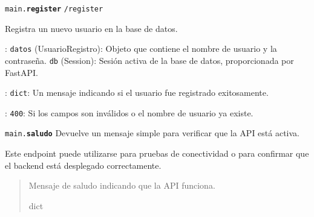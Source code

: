 \documentclass[a4paper,11pt,spanish]{sphinxmanual}
\newcommand{\robotoMonoBold}{\fontseries{b}\selectfont\ttfamily}
\renewcommand{\sphinxcode}[1]{\textcolor{sphinxorangeCode}{{\robotoMonoBold #1}}}
\renewcommand{\sphinxbfcode}[1]{\textbf{\sphinxcode{#1}}}
\renewcommand{\sphinxupquote}[1]{\texttt{#1}}
\begin{document}
\begin{fulllineitems}
\label{\detokenize{modelos:main.register}}
\pysigstartsignatures
\pysiglinewithargsret
{\sphinxcode{\sphinxupquote{main.}}\sphinxbfcode{\sphinxupquote{register}}}
{\sphinxparamcomma {}}
{}
\pysigstopsignatures
\sphinxAtStartPar
{} \sphinxcode{\sphinxupquote{/register}}

\sphinxAtStartPar
Registra un nuevo usuario en la base de datos.

\sphinxAtStartPar
{}:
\sphinxhyphen{} \sphinxcode{\sphinxupquote{datos}} (UsuarioRegistro): Objeto que contiene el nombre de usuario y la contraseña.
\sphinxhyphen{} \sphinxcode{\sphinxupquote{db}} (Session): Sesión activa de la base de datos, proporcionada por FastAPI.

\sphinxAtStartPar
{}:
\sphinxhyphen{} \sphinxcode{\sphinxupquote{dict}}: Un mensaje indicando si el usuario fue registrado exitosamente.

\sphinxAtStartPar
{}:
\sphinxhyphen{} \sphinxcode{\sphinxupquote{400}}: Si los campos son inválidos o el nombre de usuario ya existe.

\end{fulllineitems}


\begin{fulllineitems}
\label{\detokenize{modelos:main.saludo}}
\pysigstartsignatures
\pysiglinewithargsret
{\sphinxbfcode{\sphinxupquote{}}\sphinxcode{\sphinxupquote{main.}}\sphinxbfcode{\sphinxupquote{saludo}}}
{}
{}
\pysigstopsignatures
\sphinxAtStartPar
Devuelve un mensaje simple para verificar que la API está activa.

\sphinxAtStartPar
Este endpoint puede utilizarse para pruebas de conectividad o para confirmar que el backend está desplegado correctamente.
\begin{quote}\begin{description}
\sphinxAtStartPar
Mensaje de saludo indicando que la API funciona.

\sphinxAtStartPar
dict

\end{description}\end{quote}

\end{fulllineitems}
\end{document}

